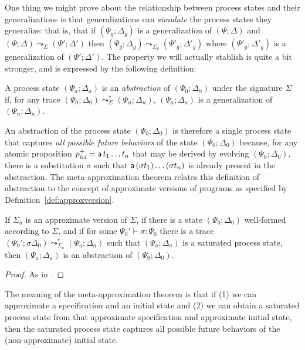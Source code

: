 One thing we might prove about the relationship between process states
and their generalizations is that generalizations can {\it simulate}
the process states they generalize: that is, that if $(\Psi_g;
\Delta_g)$ is a generalization of $(\Psi; \Delta)$ and $(\Psi; \Delta)
\leadsto_\Sigma (\Psi'; \Delta')$ then $(\Psi_g; \Delta_g)
\leadsto_{\Sigma_g} (\Psi'_g; \Delta'_g)$ where $(\Psi'_g; \Delta'_g)$
is a generalization of $(\Psi'; \Delta')$. The property we will
actually stablish is quite a bit stronger, and is expressed by the
following definition:

\bigskip
\begin{definition}
A process state $(\Psi_a; \Delta_a)$ is an {\em abstraction} of 
$(\Psi_0; \Delta_0)$ under the signature $\Sigma$ if, for any trace
$(\Psi_0; \Delta_0) \leadsto^*_\Sigma (\Psi_n; \Delta_n)$, 
$(\Psi_a; \Delta_a)$ is a generalization of $(\Psi_n; \Delta_n)$. 
\end{definition}
\bigskip

An abstraction of the process state $(\Psi_0; \Delta_0)$ is therefore
a single process state that captures {\it all possible future
  behaviors} of the state $(\Psi_0; \Delta_0)$ because, for any atomic
proposition $p^+_{\it lvl} = {\sf a}\,t_1\ldots t_n$ that may be derived
by evolving $(\Psi_0; \Delta_0)$, there is a substitution $\sigma$
such that ${\sf a}\,(\sigma t_1)\ldots(\sigma t_n)$ is already present
in the abstraction. The meta-approximation theorem relates this definition
of abstraction to the concept of approximate versions of programs as
specified by Definition~\ref{def:approxversion}.  

\bigskip
\begin{theorem}\label{thm:metapprox}
  If $\Sigma_a$ is an approximate version of $\Sigma$, if there is a
  state $(\Psi_0; \Delta_0)$ well-formed according to $\Sigma$, and if
  for some $\Psi_0' \vdash \sigma : \Psi_0$ there is a trace
  $(\Psi_0'; \sigma\Delta_0) \leadsto^*_{\Sigma_a} (\Psi_a; \Delta_a)$
  such that $(\Psi_a; \Delta_a)$ is a saturated process state, then
  $(\Psi_a; \Delta_a)$ is an abstraction of $(\Psi_0; \Delta_0)$.
\end{theorem}

\begin{proof}
As in \cite[Theorem 3]{simmons11logical}.
\end{proof}

The meaning of the meta-approximation theorem is that if (1) we can
approximate a specification and an initial state and (2) we can obtain
a saturated process state from that approximate specification
and approximate initial state, then the saturated process state captures
all possible future behaviors of the (non-approximate) initial state. 

